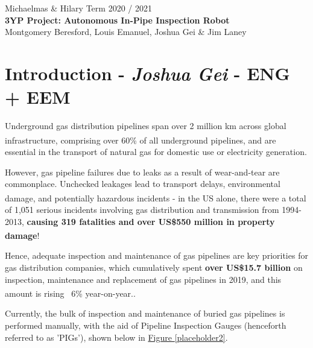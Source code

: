 \documentclass[11pt]{article}		%
\newcommand{\supercite}[1]{\textsuperscript{\cite{#1}}}		%
\newcommand{\figref}[1]{\hyperref[#1]{Figure \ref*{#1}}}    %
\begin{document}
	
	\flushleft
	\raggedright

	\begin{center}
		\vspace*{2cm}
		Michaelmas \& Hilary Term 2020 / 2021\\ %
		\vspace*{6cm}
		\huge{\textbf{3YP Project: Autonomous In-Pipe Inspection Robot}}\\ 
		\vspace*{6cm}
		\large{Montgomery Beresford, Louis Emanuel, Joshua Gei \& Jim Laney}
		\thispagestyle{empty} %
	\end{center}

	\newpage
	
	\pagestyle{empty}
	\tableofcontents
	
	\newpage
    \pagestyle{plain}
	\setcounter{page}{1}
	
	\section{Introduction - \textit{Joshua Gei} - ENG + EEM }
	
		Underground gas distribution pipelines span over 2 million km across global infrastructure\supercite{pct2020states}, comprising over 60\% of all underground pipelines\supercite{pct2020states}, and are essential in the transport of natural gas for domestic use or electricity generation. 
		
		However, gas pipeline failures due to leaks as a result of wear-and-tear are commonplace. Unchecked leakages lead to transport delays, environmental damage, and potentially hazardous incidents\supercite{pct2020states} - in the US alone, there were a total of 1,051 serious incidents involving gas distribution and transmission from 1994-2013, \textbf{causing 319 fatalities and over US\$550 million in property damage}\supercite{pct2020states}!
		
		Hence, adequate inspection and maintenance of gas pipelines are key priorities for gas distribution companies, which cumulatively spent \textbf{over US\$15.7 billion} on inspection, maintenance  and replacement of gas pipelines in 2019, and this amount is rising ~6\% year-on-year.\supercite{pct2020states}. 
		
		Currently, the bulk of inspection and maintenance of buried gas pipelines is performed manually, with the aid of Pipeline Inspection Gauges (henceforth referred to as 'PIGs'), shown below in \figref{placeholder2}. 
\end{document}
